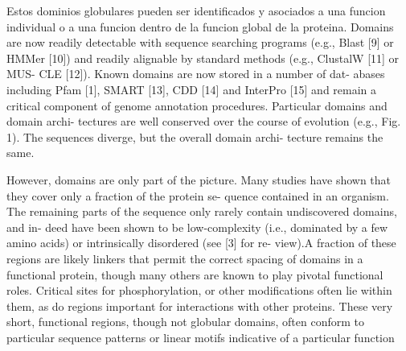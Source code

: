 
Estos dominios globulares pueden ser identificados y asociados a una funcion individual o a una funcion dentro de la funcion global de la proteina.
Domains are now readily detectable with sequence
searching programs (e.g., Blast [9] or HMMer [10]) and readily
alignable by standard methods (e.g., ClustalW [11] or MUS-
CLE [12]). Known domains are now stored in a number of dat-
abases including Pfam [1], SMART [13], CDD [14] and
InterPro [15] and remain a critical component of genome
annotation procedures. Particular domains and domain archi-
tectures are well conserved over the course of evolution (e.g.,
Fig. 1). The sequences diverge, but the overall domain archi-
tecture remains the same.












However, domains are only part of the picture. Many studies
have shown that they cover only a fraction of the protein se-
quence contained in an organism. The remaining parts of the
sequence only rarely contain undiscovered domains, and in-
deed have been shown to be low-complexity (i.e., dominated
by a few amino acids) or intrinsically disordered (see [3] for re-
view).A fraction of these regions are likely linkers that permit
the correct spacing of domains in a functional protein, though
many others are known to play pivotal functional roles. 
Critical sites for phosphorylation,
or other modifications often
lie within them, as do regions important for interactions with
other proteins. These very short, functional regions, though
not globular domains, often conform to particular sequence
patterns or linear motifs indicative of a particular function

